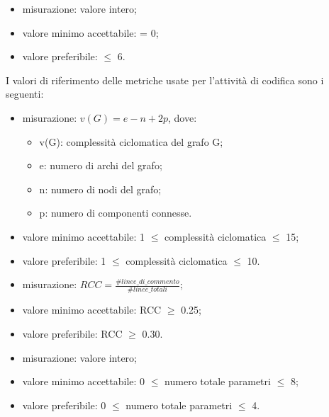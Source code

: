				\begin{itemize}
					\item{misurazione: valore intero;}
					\item{valore minimo accettabile: = 0;}
					\item{valore preferibile: $\leq$ 6.}
				\end{itemize}
		
		I valori di riferimento delle metriche usate per l'attività di codifica sono i seguenti:
					
			\begin{itemize}
				\item{misurazione: $v(G) = e - n + 2p$, dove: 
				\begin{itemize}
					\item{v(G)}: complessità ciclomatica del grafo G; 
					\item{e}: numero di archi del grafo; 
					\item{n}: numero di nodi del grafo; 
					\item{p}: numero di componenti connesse. 
				\end{itemize} }
				\item{valore minimo accettabile: 1 $\leq$ complessità ciclomatica $\leq$ 15;}
				\item{valore preferibile: 1 $\leq$ complessità ciclomatica $\leq$ 10.}
			\end{itemize}
			
			\begin{itemize}
				\item{misurazione: $RCC = \displaystyle\frac{\#linee\_di\_commento}{\#linee\_totali} $;}
				\item{valore minimo accettabile: RCC $\geq$ 0.25;}
				\item{valore preferibile: RCC $\geq$ 0.30.}
			\end{itemize}

			\begin{itemize}
				\item{misurazione: valore intero;}
				\item{valore minimo accettabile: 0 $\leq$ numero totale parametri $\leq$ 8;}
				\item{valore preferibile: 0 $\leq$ numero totale parametri $\leq$ 4.}
			\end{itemize}
			
